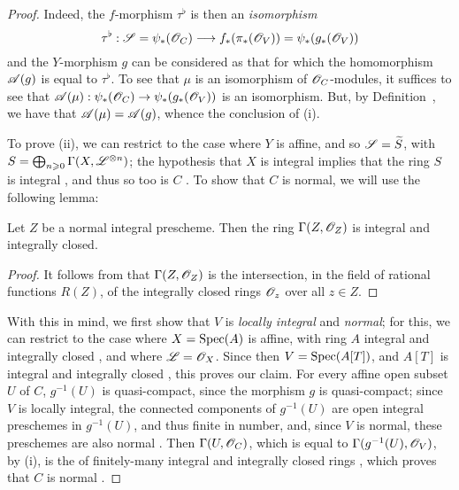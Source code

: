 \begin{proof}
Indeed, the $f$-morphism $\tau^\flat$ is then an \emph{isomorphism}
\[
\tau^\flat : \sh{S} = \psi_*(\sh{O}_C) \to f_*(\pi_*(\sh{O}_V)) = \psi_*(g_*(\sh{O}_V))
\]
and the $Y$-morphism $g$ can be considered as that for which the homomorphism $\mathscr{A}(g)$  is equal to $\tau^\flat$.
To see that $\mu$ is an isomorphism of $\mathscr{O}_C$-modules, it suffices  to see that $\sh{A}(\mu):\psi_*(\sh{O}_C)\to\psi_*(g_*(\sh{O}_V))$ is an isomorphism.
But, by Definition~, we have that $\mathscr{A}(\mu)=\mathscr{A}(g)$, whence the conclusion of (i).

To prove (ii), we can restrict to the case where $Y$ is affine, and so $\mathscr{S}=\widetilde{S}$, with
$S=\bigoplus_{n\geqslant0}\Gamma(X,\mathscr{L}^{\otimes n})$;
the hypothesis that $X$ is integral implies that the ring $S$ is integral , and thus so too is $C$ .
To show that $C$ is normal, we will use the following lemma:

\begin{lemma}[8.8.6.1]
\label{II.8.8.6.1}
Let $Z$ be a normal integral prescheme.
Then the ring $\Gamma(Z,\mathscr{O}_Z)$ is integral and integrally closed.
\end{lemma}

\begin{proof}
It follows from  that $\Gamma(Z,\mathscr{O}_Z)$ is the intersection, in the field of rational functions $R(Z)$, of the integrally closed rings $\mathscr{O}_z$ over all $z\in Z$.
\end{proof}

With this in mind, we first show that $V$ is \emph{locally integral} and \emph{normal};
for this, we can restrict to the case where $X=\operatorname{Spec}(A)$ is affine, with ring $A$ integral and integrally closed , and where $\mathscr{L}=\mathscr{O}_X$.
Since then $V=\operatorname{Spec}(A[T])$, and $A[T]$ is integral and integrally closed \cite[p.~99]{II-24}, this proves our claim.
For every affine open subset $U$ of $C$, $g^{-1}(U)$ is quasi-compact, since the morphism $g$ is quasi-compact;
since $V$ is locally integral, the connected components of $g^{-1}(U)$ are open integral preschemes in $g^{-1}(U)$, and thus finite in number, and, since $V$ is normal, these preschemes are also normal .
Then $\Gamma(U,\mathscr{O}_C)$, which is equal to $\Gamma(g^{-1}(U),\mathscr{O}_V)$, by (i), is the  of finitely-many integral and integrally closed rings , which proves that $C$ is normal .
\end{proof}

